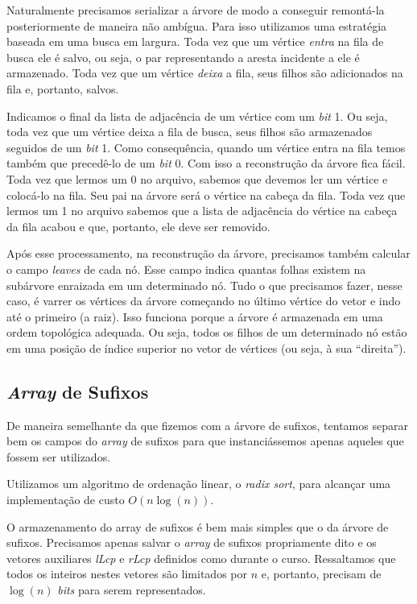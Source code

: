 \documentclass[]{article}
\begin{document}
Naturalmente precisamos serializar a árvore de modo a conseguir remontá-la posteriormente de maneira não ambígua. Para isso utilizamos uma estratégia baseada em uma busca em largura. Toda vez que um vértice \textit{entra} na fila de busca ele é salvo, ou seja, o par representando a aresta incidente a ele é armazenado. Toda vez que um vértice \textit{deixa} a fila, seus filhos são adicionados na fila e, portanto, salvos. 

Indicamos o final da lista de adjacência de um vértice com um \textit{bit} 1. Ou seja, toda vez que um vértice deixa a fila de busca, seus filhos são armazenados seguidos de um \textit{bit} 1. Como consequência, quando um vértice entra na fila temos também que precedê-lo de um \textit{bit} 0. Com isso a reconstrução da árvore fica fácil. Toda vez que lermos um 0 no arquivo, sabemos que devemos ler um vértice e colocá-lo na fila. Seu pai na árvore será o vértice na cabeça da fila. Toda vez que lermos um 1 no arquivo sabemos que a lista de adjacência do vértice na cabeça da fila acabou e que, portanto, ele deve ser removido. 

Após esse processamento, na reconstrução da árvore, precisamos também calcular o campo \textit{leaves} de cada nó. Esse campo indica quantas folhas existem na subárvore enraizada em um determinado nó. Tudo o que precisamos fazer, nesse caso, é varrer os vértices da árvore começando no último vértice do vetor e indo até o primeiro (a raiz). Isso funciona porque a árvore é armazenada em uma ordem topológica adequada. Ou seja, todos os filhos de um determinado nó estão em uma posição de índice superior no vetor de vértices (ou seja, à sua ``direita'').

\subsection{\textit{Array} de Sufixos}

De maneira semelhante da que fizemos com a árvore de sufixos, tentamos separar bem os campos do \textit{array} de sufixos para que instanciássemos apenas aqueles que fossem ser utilizados.

Utilizamos um algoritmo de ordenação linear, o \textit{radix sort}, para alcançar uma implementação de custo $O(n\log(n))$.

O armazenamento do array de sufixos é bem mais simples que o da árvore de sufixos. Precisamos apenas salvar o \textit{array} de sufixos propriamente dito e os vetores auxiliares \textit{lLcp} e \textit{rLcp} definidos como durante o curso. Ressaltamos que todos os inteiros nestes vetores são limitados por $n$ e, portanto, precisam de $\log(n)$ \textit{bits} para serem representados.
\end{document}
